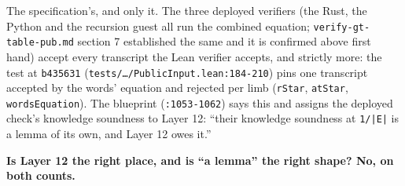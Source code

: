 The specification's, and only it. The three deployed verifiers (the Rust, the Python and the recursion guest all run the combined equation; \texttt{verify-{}gt-{}table-{}pub.\allowbreak{}md} section 7 established the same and it is confirmed above first hand) accept every transcript the Lean verifier accepts, and strictly more: the test at \texttt{b435631} (\texttt{t\allowbreak{}e\allowbreak{}s\allowbreak{}t\allowbreak{}s\allowbreak{}/\allowbreak{}…\allowbreak{}/\allowbreak{}P\allowbreak{}u\allowbreak{}b\allowbreak{}l\allowbreak{}i\allowbreak{}c\allowbreak{}I\allowbreak{}n\allowbreak{}p\allowbreak{}u\allowbreak{}t\allowbreak{}.\allowbreak{}l\allowbreak{}e\allowbreak{}a\allowbreak{}n\allowbreak{}:\allowbreak{}1\allowbreak{}8\allowbreak{}4\allowbreak{}-{}\allowbreak{}2\allowbreak{}1\allowbreak{}0}) pins one transcript accepted by the words' equation and rejected per limb (\texttt{rStar}, \texttt{atStar}, \texttt{wordsEquation}). The blueprint (\texttt{:1053-{}1062}) says this and assigns the deployed check's knowledge soundness to Layer 12: \enquote{their knowledge soundness at \texttt{1/\allowbreak{}|E|} is a lemma of its own, and Layer 12 owes it.}

\textbf{Is Layer 12 the right place, and is \enquote{a lemma} the right shape? No, on both counts.}

